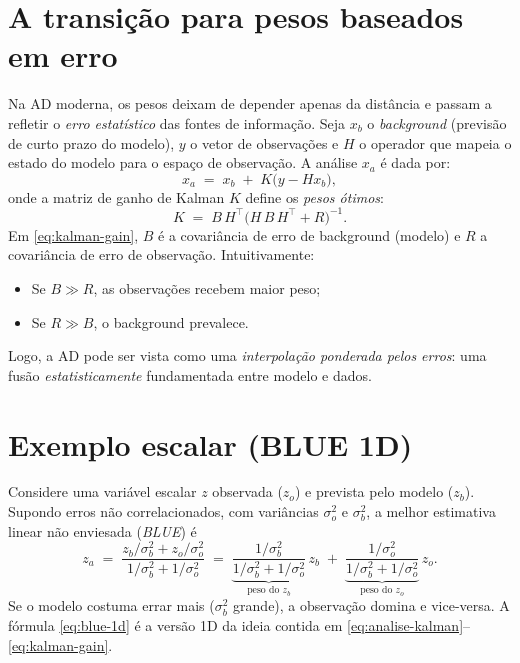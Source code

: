 \section{A transição para pesos baseados em erro}
Na AD moderna, os pesos deixam de depender apenas da distância e passam a refletir o \emph{erro estatístico} das fontes de informação. Seja $x_b$ o \emph{background} (previsão de curto prazo do modelo), $y$ o vetor de observações e $H$ o operador que mapeia o estado do modelo para o espaço de observação. A análise $x_a$ é dada por:
\begin{equation}
x_a \;=\; x_b \;+\; K\big(y - Hx_b\big),
\label{eq:analise-kalman}
\end{equation}
onde a matriz de ganho de Kalman $K$ define os \emph{pesos ótimos}:
\begin{equation}
K \;=\; B\,H^\top\big(H\,B\,H^\top + R\big)^{-1}.
\label{eq:kalman-gain}
\end{equation}
Em \eqref{eq:kalman-gain}, $B$ é a covariância de erro de background (modelo) e $R$ a covariância de erro de observação. Intuitivamente:
\begin{itemize}
  \item Se $B \gg R$, as observações recebem maior peso;
  \item Se $R \gg B$, o background prevalece.
\end{itemize}
Logo, a AD pode ser vista como uma \emph{interpolação ponderada pelos erros}: uma fusão \emph{estatisticamente} fundamentada entre modelo e dados.

\section{Exemplo escalar (BLUE 1D)}
Considere uma variável escalar $z$ observada ($z_o$) e prevista pelo modelo ($z_b$). Supondo erros não correlacionados, com variâncias $\sigma_o^2$ e $\sigma_b^2$, a melhor estimativa linear não enviesada (\emph{BLUE}) é
\begin{equation}
z_a \;=\; \frac{z_b/\sigma_b^2 + z_o/\sigma_o^2}{\,1/\sigma_b^2 + 1/\sigma_o^2\,}
\;=\;
\underbrace{\frac{1/\sigma_b^2}{1/\sigma_b^2 + 1/\sigma_o^2}}_{\text{peso do } z_b}\, z_b
\;+\;
\underbrace{\frac{1/\sigma_o^2}{1/\sigma_b^2 + 1/\sigma_o^2}}_{\text{peso do } z_o}\, z_o.
\label{eq:blue-1d}
\end{equation}
Se o modelo costuma errar mais ($\sigma_b^2$ grande), a observação domina e vice-versa. A fórmula \eqref{eq:blue-1d} é a versão 1D da ideia contida em \eqref{eq:analise-kalman}--\eqref{eq:kalman-gain}.

